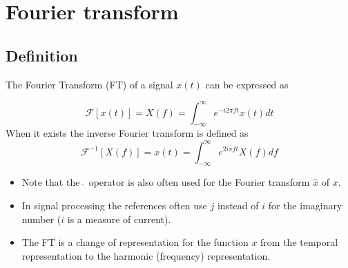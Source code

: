 \section{Fourier transform}
\label{sec:fourier-transform}


\subsection{Definition}
\label{sec:}

    The Fourier Transform (FT) of a signal  $x(t)$ can be expressed as

    \begin{equation}
      \mathcal{F}[x(t)]= X(f) = \int_{-\infty}^\infty e^{- i 2 \pi f t} x(t) d t 
      \label{eq:fourier_tranform}
    \end{equation}
    When it exists the inverse Fourier transform is defined as
    \begin{equation}
      \mathcal{F}^{-1}[X(f)] = x(t)= \int_{-\infty}^\infty e^{  2 i  \pi f t} X(f) d f
      \label{eq:inverse_fourier}
    \end{equation}

    \begin{itemize}
      \item Note that the $\hat \;$ operator is also often used for the Fourier
      transform $\hat x$ of $x$.
      \item In signal processing the references often use $j$ instead of $i$
      for the imaginary number ($i$ is a measure of current).
      \item The FT is a change of representation for the function $x$ from the temporal representation to the harmonic (frequency) representation.
    \end{itemize}




